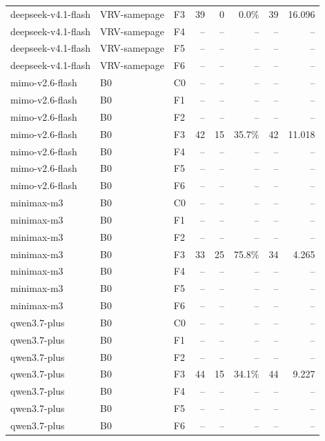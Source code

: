 \begin{tabular}{lllrrrrr}
deepseek-v4.1-flash & VRV-samepage & F3 & 39 & 0 & 0.0\% & 39 & 16.096 \\
deepseek-v4.1-flash & VRV-samepage & F4 & -- & -- & -- & -- & -- \\
deepseek-v4.1-flash & VRV-samepage & F5 & -- & -- & -- & -- & -- \\
deepseek-v4.1-flash & VRV-samepage & F6 & -- & -- & -- & -- & -- \\
mimo-v2.6-flash & B0 & C0 & -- & -- & -- & -- & -- \\
mimo-v2.6-flash & B0 & F1 & -- & -- & -- & -- & -- \\
mimo-v2.6-flash & B0 & F2 & -- & -- & -- & -- & -- \\
mimo-v2.6-flash & B0 & F3 & 42 & 15 & 35.7\% & 42 & 11.018 \\
mimo-v2.6-flash & B0 & F4 & -- & -- & -- & -- & -- \\
mimo-v2.6-flash & B0 & F5 & -- & -- & -- & -- & -- \\
mimo-v2.6-flash & B0 & F6 & -- & -- & -- & -- & -- \\
minimax-m3 & B0 & C0 & -- & -- & -- & -- & -- \\
minimax-m3 & B0 & F1 & -- & -- & -- & -- & -- \\
minimax-m3 & B0 & F2 & -- & -- & -- & -- & -- \\
minimax-m3 & B0 & F3 & 33 & 25 & 75.8\% & 34 & 4.265 \\
minimax-m3 & B0 & F4 & -- & -- & -- & -- & -- \\
minimax-m3 & B0 & F5 & -- & -- & -- & -- & -- \\
minimax-m3 & B0 & F6 & -- & -- & -- & -- & -- \\
qwen3.7-plus & B0 & C0 & -- & -- & -- & -- & -- \\
qwen3.7-plus & B0 & F1 & -- & -- & -- & -- & -- \\
qwen3.7-plus & B0 & F2 & -- & -- & -- & -- & -- \\
qwen3.7-plus & B0 & F3 & 44 & 15 & 34.1\% & 44 & 9.227 \\
qwen3.7-plus & B0 & F4 & -- & -- & -- & -- & -- \\
qwen3.7-plus & B0 & F5 & -- & -- & -- & -- & -- \\
qwen3.7-plus & B0 & F6 & -- & -- & -- & -- & -- \\
\bottomrule
\end{tabular}
